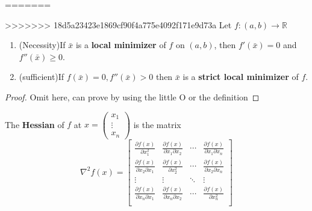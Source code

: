 \begin{corollary}

=======
\begin{corollary}
>>>>>>> 18d5a23423e1869cf90f4a775e4092f171e9d73a
    Let $f: (a,b) \rightarrow \mathbb R$
    \begin{enumerate}
        \item (Necessity)If $\bar x$ is a \textbf{local minimizer} of $f$ on $(a,b)$, then $f'(\bar x) = 0$ and $f''(\bar x) \geq 0$.
        \item (sufficient)If $f(\bar x) = 0, f''(\bar x) > 0$ then $\bar x$ is a \textbf{strict local minimizer} of $f$.
    \end{enumerate}

    
\end{corollary}
\begin{proof}
    Omit here, can prove by using the little O or the definition
\end{proof}
\begin{definition}[Hessian]
    The \textbf{Hessian} of $f$ at $x = \begin{pmatrix}
        x_1 \\ \vdots \\ x_n
    \end{pmatrix}$ is the matrix
    $$\nabla^2 f(x) = \begin{bmatrix}
        \frac{\partial f(x)}{\partial x^2_1} & \frac{\partial f(x)}{\partial x_1 \partial x_2} & \cdots & \frac{\partial f(x)}{\partial x_1 \partial x_n} \\
        \frac{\partial f(x)}{\partial x_2 \partial x_1} & \frac{\partial f(x)}{\partial x_2^2} & \cdots & \frac{\partial f(x)}{\partial x_2 \partial x_n} \\
        \vdots & \vdots & \ddots & \vdots \\
        \frac{\partial f(x)}{\partial x_n \partial x_1} & \frac{\partial f(x)}{\partial x_n \partial x_2} & \cdots & \frac{\partial f(x)}{\partial x_n^2} \\
    \end{bmatrix}$$
\end{definition}


\end{corollary}
